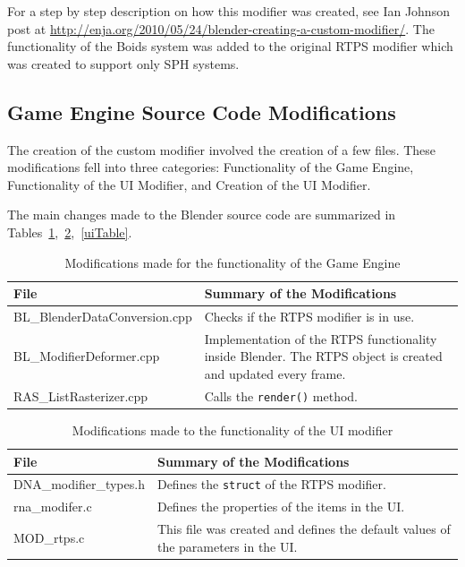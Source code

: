 For a step by step description on how this modifier was created, see Ian Johnson post at \url{http://enja.org/2010/05/24/blender-creating-a-custom-modifier/}.  The functionality of the Boids system was added to the original RTPS modifier which was created to support only SPH systems. 

\subsection{Game Engine Source Code Modifications}
The creation of the custom modifier involved the creation of a few files. These modifications fell into three categories: Functionality of the Game Engine, Functionality of the UI Modifier, and  Creation of the UI Modifier.

The main changes made to the Blender source code are summarized in Tables~\ref{geTable},~\ref{funcTable},~\ref{uiTable}.


\begin{table}[htdp]
\caption{Modifications made for the functionality of the Game Engine}
\begin{center}
\begin{tabular}{|p{6cm}|p{6cm}|}
\hline 
\textbf{File} & \textbf{Summary of the Modifications} \\\hline 
BL\_BlenderDataConversion.cpp & Checks if the RTPS modifier is in use. \\\hline 
BL\_ModifierDeformer.cpp & Implementation of the RTPS functionality inside Blender. The RTPS object is created and updated every frame. \\\hline 
RAS\_ListRasterizer.cpp & Calls the \texttt{render()} method. \\
\hline 
\end{tabular} 
\end{center}
\label{geTable}
\end{table}

\begin{table}[htdp]
\caption{Modifications made to the functionality of the UI modifier}
\begin{center}
\begin{tabular}{|p{6cm}|p{6cm}|}
\hline 
\textbf{File} & \textbf{Summary of the Modifications} \\\hline 
DNA\_modifier\_types.h & Defines the \texttt{struct} of the RTPS modifier. \\\hline 
rna\_modifer.c & Defines the properties of the items in the UI. \\\hline 
MOD\_rtps.c & This file was created and defines the default values of the parameters in the UI. \\
\hline 
\end{tabular}
\end{center}
\label{funcTable}
\end{table}

